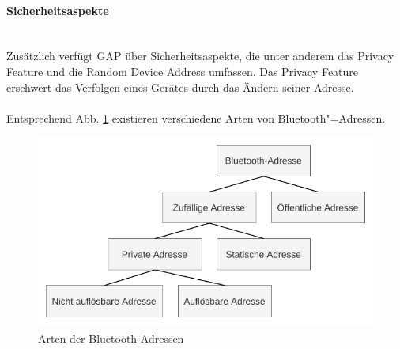 \paragraph{Sicherheitsaspekte} \mbox{} \vspace{0.2cm} \\
\label{sec: gap sicherheit}
Zusätzlich verfügt GAP über Sicherheitsaspekte, die unter anderem das Privacy Feature und die Random Device Address umfassen. Das Privacy Feature erschwert das Verfolgen eines Gerätes durch das Ändern seiner Adresse.
\\\\
Entsprechend Abb. \ref{fig: bt adressen arten} existieren verschiedene Arten von Bluetooth"=Adressen.

\begin{figure}[H]
    \centering
    \includegraphics{graphics/BT_Adressen_Baum.pdf}
    \caption{Arten der Bluetooth-Adressen}
    \label{fig: bt adressen arten}
\end{figure}

